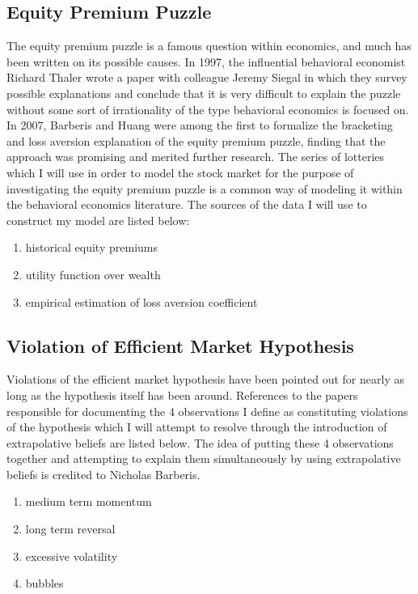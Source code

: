 \documentclass[10pt,twocolumn]{article}
\begin{document}
\subsection{Equity Premium Puzzle}
The equity premium puzzle is a famous question within economics, and much has been written on its possible causes. In 1997, the influential behavioral economist Richard Thaler wrote a paper with colleague Jeremy Siegal in which they survey possible explanations and conclude that it is very difficult to explain the puzzle without some sort of irrationality of the type behavioral economics is focused on.\cite{thaler}  In 2007, Barberis and Huang were among the first to formalize the bracketing and loss aversion explanation of the equity premium puzzle, finding that the approach was promising and merited further research.\cite{BarberisEPP} The series of lotteries which I will use in order to model the stock market for the purpose of investigating the equity premium puzzle is a common way of modeling it within the behavioral economics literature. The sources of the data I will use to construct my model are listed below:
\begin{enumerate}
    \item historical equity premiums\cite{equitypremiums}
    \item utility function over wealth\cite{utilitywealth}
    \item empirical estimation of loss aversion coefficient\cite{lossaversion}
\end{enumerate}

\subsection{Violation of Efficient Market Hypothesis}
Violations of the efficient market hypothesis have been pointed out for nearly as long as the hypothesis itself has been around. References to the papers responsible for documenting the 4 observations I define as constituting violations of the hypothesis which I will attempt to resolve through the introduction of extrapolative beliefs are listed below. The idea of putting these 4 observations together and attempting to explain them simultaneously by using extrapolative beliefs is credited to Nicholas Barberis.\cite{BarberisEMH}
\begin{enumerate}
    \item medium term momentum\cite{MedTermMomentum}
    \item long term reversal\cite{LongTermReversal}
    \item excessive volatility\cite{volatility}
    \item bubbles\cite{bubbles}
\end{enumerate}
\end{document}
